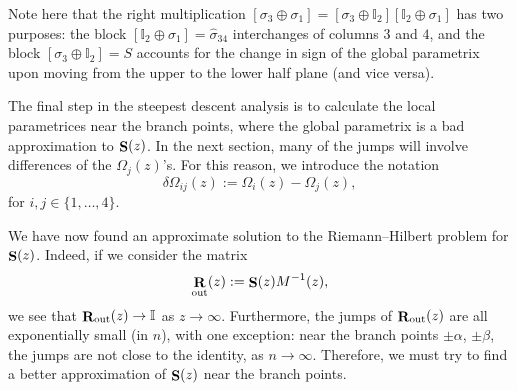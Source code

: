 \documentclass[pdftex]{sigma}
\DeclareMathOperator{\boldS}{{\bf S}}
\DeclareMathOperator{\boldR}{{\bf R}}
\numberwithin{equation}{section}
\begin{document}
\begin{Remark}
 Note here that the right multiplication $[\sigma_3 \oplus \sigma_1] = [\sigma_3\oplus \mathbb{I}_2][\mathbb{I}_2\oplus \sigma_1]$ has two purposes: the
block $[\mathbb{I}_2\oplus \sigma_1] = \hat{\sigma}_{34}$ interchanges of columns $3$ and $4$, and the block $[\sigma_3\oplus \mathbb{I}_2] = S$ accounts
for the change in sign of the global parametrix upon moving from the upper to the lower half plane (and vice versa).
\end{Remark}

\begin{Remark}
 The final step in the steepest descent analysis is to calculate the local parametrices near the branch points, where the global parametrix is a bad approximation to $\boldS(z)$. In the next section, many of the jumps will involve differences of the $\Omega_j(z)$'s. For this reason, we introduce the notation
 \begin{equation*}
 \delta \Omega_{ij}(z) := \Omega_i(z) - \Omega_j(z),
 \end{equation*}
 for $i,j\in \{1,\dots,4\}$.
\end{Remark}

We have now found an approximate solution to the Riemann--Hilbert problem for $\boldS(z)$. Indeed, if we consider the matrix
 \begin{equation*}
 \boldR_{\rm out}(z) := \boldS(z)M^{-1}(z),
 \end{equation*}
we see that $\boldR_{\rm out}(z) \to \mathbb{I}$ as $z\to \infty$. Furthermore, the jumps of $\boldR_{\rm out}(z)$ are all exponentially small (in $n$), with one exception: near the branch points $\pm \alpha$, $\pm \beta$, the jumps are not close to the identity, as $n\to \infty$. Therefore, we must try to find a better approximation of $\boldS(z)$ near the branch points.
\end{document}
